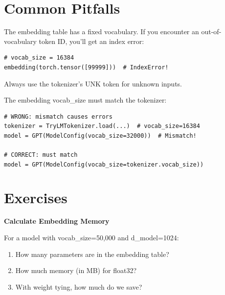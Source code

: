 \section{Common Pitfalls}

\begin{pitfall}[title=Forgetting to Handle Unknown Tokens]
The embedding table has a fixed vocabulary. If you encounter an out-of-vocabulary token ID, you'll get an index error:

\begin{lstlisting}[style=python]
# vocab_size = 16384
embedding(torch.tensor([99999]))  # IndexError!
\end{lstlisting}

Always use the tokenizer's UNK token for unknown inputs.
\end{pitfall}

\begin{pitfall}[title=Mismatched Vocabulary Sizes]
The embedding vocab\_size must match the tokenizer:

\begin{lstlisting}[style=python]
# WRONG: mismatch causes errors
tokenizer = TryLMTokenizer.load(...)  # vocab_size=16384
model = GPT(ModelConfig(vocab_size=32000))  # Mismatch!

# CORRECT: must match
model = GPT(ModelConfig(vocab_size=tokenizer.vocab_size))
\end{lstlisting}
\end{pitfall}

\section{Exercises}

\begin{exercise}
\textbf{Calculate Embedding Memory}

For a model with vocab\_size=50,000 and d\_model=1024:
\begin{enumerate}
    \item How many parameters are in the embedding table?
    \item How much memory (in MB) for float32?
    \item With weight tying, how much do we save?
\end{enumerate}
\end{exercise}


